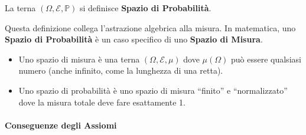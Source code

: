 La terna $(\Omega, \mathcal{E}, \mathbb{P})$ si definisce \textbf{Spazio di Probabilità}.

Questa definizione collega l'astrazione algebrica alla misura.
In matematica, uno \textbf{Spazio di Probabilità} è un caso specifico di uno \textbf{Spazio di Misura}.

\begin{itemize}
    \item Uno spazio di misura è una terna $(\Omega, \mathcal{E}, \mu)$ dove $\mu(\Omega)$ può essere qualsiasi numero (anche infinito, come la lunghezza di una retta).
    \item Uno spazio di probabilità è uno spazio di misura ``finito'' e ``normalizzato'' dove la misura totale deve fare esattamente 1.
\end{itemize}

\paragraph{Conseguenze degli Assiomi}

